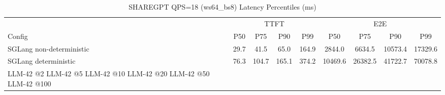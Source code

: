 \begin{table}[htbp]
\centering
\caption{SHAREGPT QPS=18 (ws64_bs8) Latency Percentiles (ms)}
\label{tab:sharegpt_qps18_ws64_bs8}
\begin{tabular}{l|cccc|cccc}
\toprule
& \multicolumn{4}{c|}{TTFT} & \multicolumn{4}{c}{E2E} \\
Config & P50 & P75 & P90 & P99 & P50 & P75 & P90 & P99 \\
\midrule
SGLang non-deterministic & 29.7 & 41.5 & 65.0 & 164.9 & 2844.0 & 6634.5 & 10573.4 & 17329.6 \\
SGLang deterministic & 76.3 & 104.7 & 165.1 & 374.2 & 10469.6 & 26382.5 & 41722.7 & 70078.8 \\
LLM-42 @2%
LLM-42 @5%
LLM-42 @10%
LLM-42 @20%
LLM-42 @50%
LLM-42 @100%
\bottomrule
\end{tabular}
\end{table}
